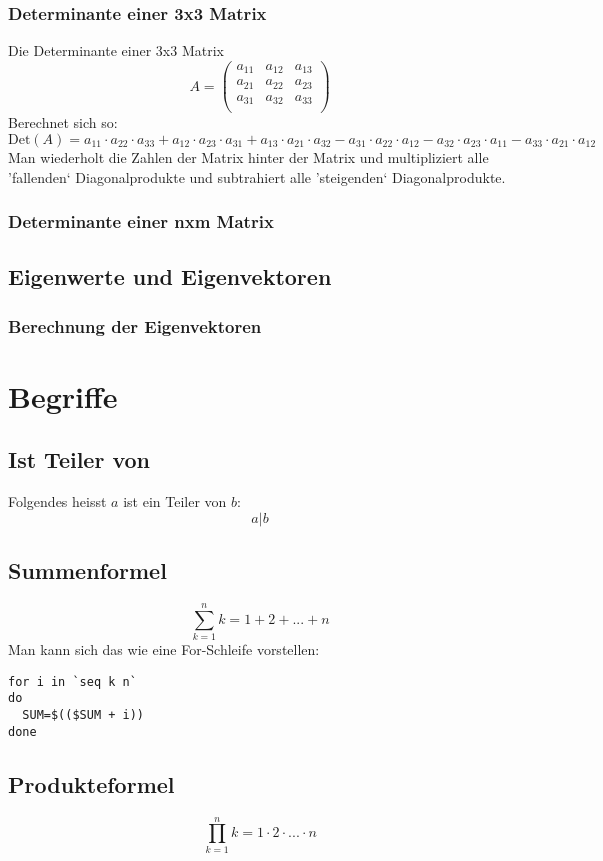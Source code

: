 \subsubsection{Determinante einer 3x3 Matrix}
Die Determinante einer 3x3 Matrix
\[ A =
  \begin {pmatrix}
    a_{11} & a_{12} & a_{13} \\
    a_{21} & a_{22} & a_{23} \\
    a_{31} & a_{32} & a_{33} \\
  \end {pmatrix} \]
Berechnet sich so:
\[ \text{Det}(A) = 
a_{11} \cdot a_{22} \cdot a_{33} +
a_{12} \cdot a_{23} \cdot a_{31} +
a_{13} \cdot a_{21} \cdot a_{32} -
a_{31} \cdot a_{22} \cdot a_{12} -
a_{32} \cdot a_{23} \cdot a_{11} -
a_{33} \cdot a_{21} \cdot a_{12}
\]
Man wiederholt die Zahlen der Matrix hinter der Matrix und multipliziert
alle 'fallenden` Diagonalprodukte und subtrahiert alle 'steigenden`
Diagonalprodukte.

\subsubsection{Determinante einer nxm Matrix}
\subsection{Eigenwerte und Eigenvektoren}
\subsubsection{Berechnung der Eigenvektoren}

\section{Begriffe}
\subsection{Ist Teiler von}
Folgendes heisst $a$ ist ein Teiler von $b$:
\[ a | b\]
\subsection{Summenformel}
\[\sum \limits_{k=1}^n k = 1 + 2 + ... + n \]
Man kann sich das wie eine For-Schleife vorstellen:
\begin{verbatim}
for i in `seq k n`
do
  SUM=$(($SUM + i))
done
\end{verbatim}
\subsection{Produkteformel}
\[\prod \limits_{k=1}^{n}k = 1\cdot 2\cdot ... \cdot n \]



